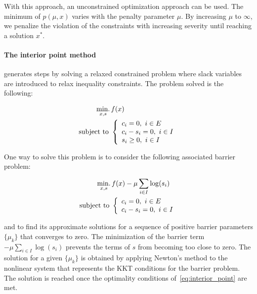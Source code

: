 With this approach, an unconstrained optimization approach can be used.
The minimum of $p(\mu,x)$ varies with the penalty parameter $\mu$.
By increasing $\mu$ to $\infty$, we penalize the violation of the constraints with increasing severity until reaching a solution $x^*$.

\paragraph{The interior point method} generates steps by solving a relaxed constrained problem where slack variables are introduced to relax inequality constraints.
The problem solved is the following:

\begin{equation}
\label{eq:interior_point}
\begin{aligned}
  \operatorname*{min.}_{x,s}{} & f(x)\\
  \text{subject to }&
  \left\{
    \begin{array}{l}
     c_i = 0,\ i\in E\\
     c_i - s_i = 0,\ i\in I\\
     s_i \geq 0,\ i\in I
  \end{array}
  \right.
\end{aligned}
\end{equation}

One way to solve this problem is to consider the following associated barrier problem:

\begin{equation}
\begin{aligned}
\label{eq:barrier_question}
  \operatorname*{min.}_{x,s}{} & f(x)- \mu\sum_{i\in I} \log(s_i)\\
  \text{subject to } &
  \left\{
    \begin{array}{l}
     c_i = 0,\ i\in E\\
     c_i - s_i = 0,\ i\in I\\
  \end{array}
  \right.
\end{aligned}
\end{equation}

and to find its approximate solutions for a sequence of positive barrier parameters $\{\mu_k\}$ that converges to zero.
The minimization of the barrier term $-\mu\sum_{i\in I} \log(s_i)$ prevents the terms of $s$ from becoming too close to zero.
The solution for a given $\{\mu_k\}$ is obtained by applying Newton's method to the nonlinear system that represents the KKT conditions for the barrier problem.
The solution is reached once the optimality conditions of~\ref{eq:interior_point} are met.

